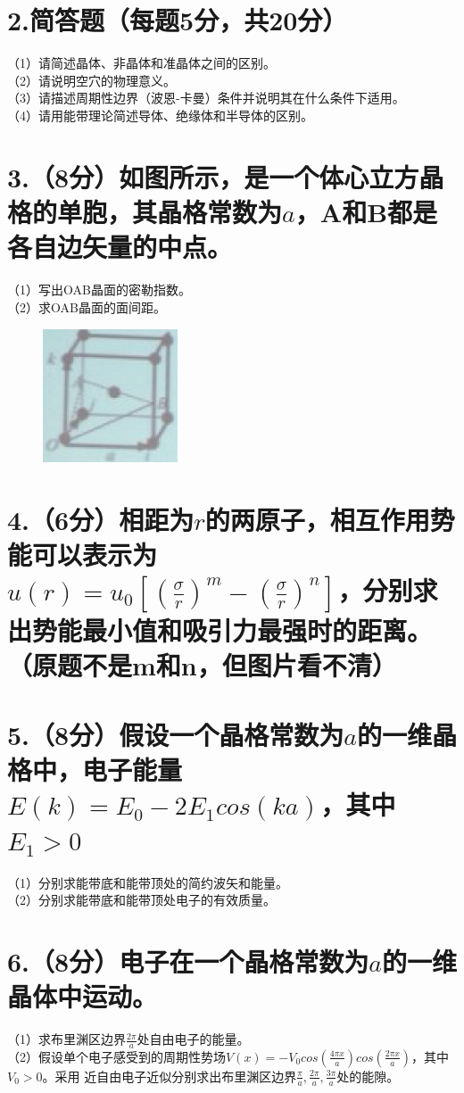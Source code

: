 \documentclass[UTF8]{ctexart}
\begin{document}
\section*{\bfseries 2.简答题（每题5分，共20分）}
（1）请简述晶体、非晶体和准晶体之间的区别。\\
（2）请说明空穴的物理意义。\\
（3）请描述周期性边界（波恩-卡曼）条件并说明其在什么条件下适用。\\
（4）请用能带理论简述导体、绝缘体和半导体的区别。\\
\section*{\bfseries 3.（8分）如图所示，是一个体心立方晶格的单胞，其晶格常数为$a$，A和B都是各自边矢量的中点。}
（1）写出OAB晶面的密勒指数。\\
（2）求OAB晶面的面间距。\\
\begin{figure}[H]
    \centering
    \includegraphics[width=4cm,height=4cm]{3.png}
\end{figure}
\section*{\bfseries 4.（6分）相距为$r$的两原子，相互作用势能可以表示为$u(r)=u_0[(\frac{\sigma}{r})^m-
(\frac{\sigma}{r})^n]$，分别求出势能最小值和吸引力最强时的距离。（原题不是m和n，但图片看不清）}
\section*{\bfseries 5.（8分）假设一个晶格常数为$a$的一维晶格中，电子能量$E(k)=E_0-2E_1cos(ka)$，其中$E_1>0$}
（1）分别求能带底和能带顶处的简约波矢和能量。\\
（2）分别求能带底和能带顶处电子的有效质量。\\
\section*{\bfseries 6.（8分）电子在一个晶格常数为$a$的一维晶体中运动。}
（1）求布里渊区边界$\frac{2\pi}{a}$处自由电子的能量。\\
（2）假设单个电子感受到的周期性势场$V(x)=-V_0cos(\frac{4\pi x}{a})cos(\frac{2\pi x}{a})$，其中$V_0>0$。采用
近自由电子近似分别求出布里渊区边界$\frac{\pi}{a},\frac{2\pi}{a},\frac{3\pi}{a}$处的能隙。\\
\end{document}
